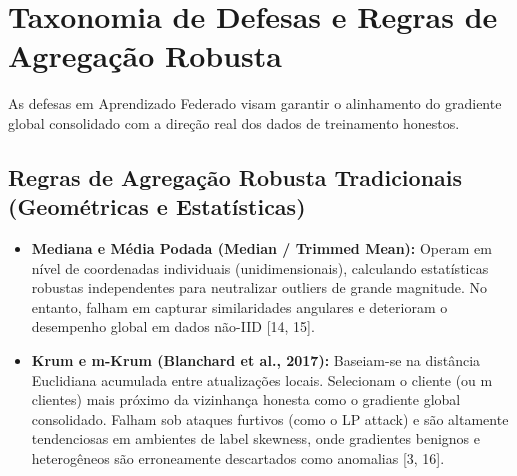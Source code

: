 \documentclass[11pt,a4paper]{article}
\begin{document}
\section{Taxonomia de Defesas e Regras de Agregação Robusta}
As defesas em Aprendizado Federado visam garantir o alinhamento do gradiente global consolidado com a direção real dos dados de treinamento honestos.

\subsection{Regras de Agregação Robusta Tradicionais (Geométricas e Estatísticas)}
\begin{itemize}
\item \textbf{Mediana e Média Podada (Median / Trimmed Mean):} Operam em nível de coordenadas individuais (unidimensionais), calculando estatísticas robustas independentes para neutralizar outliers de grande magnitude. No entanto, falham em capturar similaridades angulares e deterioram o desempenho global em dados não-IID [14, 15].
\item \textbf{Krum e m-Krum (Blanchard et al., 2017):} Baseiam-se na distância Euclidiana acumulada entre atualizações locais. Selecionam o cliente (ou m clientes) mais próximo da vizinhança honesta como o gradiente global consolidado. Falham sob ataques furtivos (como o LP attack) e são altamente tendenciosas em ambientes de label skewness, onde gradientes benignos e heterogêneos são erroneamente descartados como anomalias [3, 16].
\end{itemize}
\end{document}
